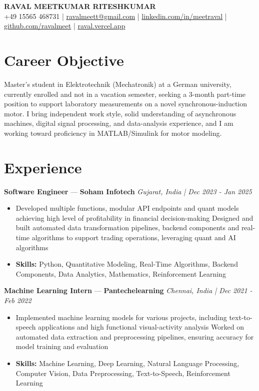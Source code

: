 \documentclass[a4paper,10pt]{article}
\begin{document}
\begin{center}
  {\Large\bfseries RAVAL MEETKUMAR RITESHKUMAR}\\[2pt]
  {\small +49 15565 468731 \;|\; \href{mailto:ravalmeett@gmail.com}{ravalmeett@gmail.com} \;|\; \href{https://www.linkedin.com/in/meetraval/}{linkedin.com/in/meetraval} \;|\; \href{https://github.com/ravalmeet}{github.com/ravalmeet} \;|\; \href{https://raval.vercel.app/}{raval.vercel.app}}
\end{center}
\vspace{-3pt}

\section*{Career Objective}
Master's student in Elektrotechnik (Mechatronik) at a German university, currently enrolled and not in a vacation semester, seeking a 3-month part-time position to support laboratory measurements on a novel synchronous-induction motor. I bring independent work style, solid understanding of asynchronous machines, digital signal processing, and data-analysis experience, and I am working toward proficiency in MATLAB/Simulink for motor modeling.\par

\section*{Experience}
\textbf{Software Engineer} — \textbf{Soham Infotech} \hfill \textit{Gujarat, India \;|\; Dec 2023 - Jan 2025}\par
\vspace{1pt}
\begin{itemize}
  \item Developed multiple functions, modular API endpoints and quant models achieving high level of profitability in financial decision-making Designed and built automated data transformation pipelines, backend components and real-time algorithms to support trading operations, leveraging quant and AI algorithms
  \item \textbf{Skills:} Python, Quantitative Modeling, Real-Time Algorithms, Backend Components, Data Analytics, Mathematics, Reinforcement Learning
\end{itemize}
\vspace{3pt}
\textbf{Machine Learning Intern} — \textbf{Pantechelearning} \hfill \textit{Chennai, India \;|\; Dec 2021 - Feb 2022}\par
\vspace{1pt}
\begin{itemize}
  \item Implemented machine learning models for various projects, including text-to-speech applications and high functional visual-activity analysis Worked on automated data extraction and preprocessing pipelines, ensuring accuracy for model training and evaluation
  \item \textbf{Skills:} Machine Learning, Deep Learning, Natural Language Processing, Computer Vision, Data Preprocessing, Text-to-Speech, Reinforcement Learning
\end{itemize}
\end{document}
